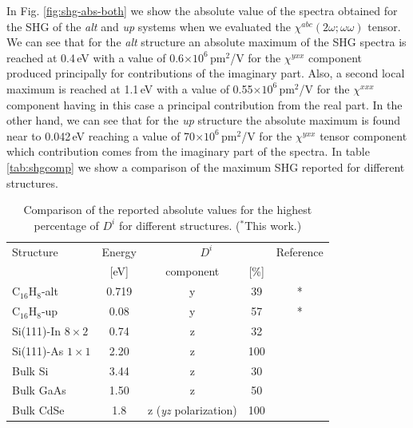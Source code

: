 \documentclass[pss]{wiley2sp} %
\begin{document}
In Fig. \ref{fig:shg-abs-both}  we show the absolute value of the  spectra obtained
for the SHG of the \emph{alt} and \emph{up} systems when we evaluated the $
\chi^{abc}(2\omega;\omega\omega) $ tensor. We can see
that for the \emph{alt} structure an absolute
maximum of the SHG spectra is reached at 0.4\,eV with a value of
0.6$\times10^{6} $\,pm$^{2}$/V for the $\chi^{yxx} $ component produced
principally for contributions of the imaginary part. Also, a second local
maximum is reached at 1.1\,eV with a value of 0.55$\times10^{6} $\,pm$^{2}$/V
for the $\chi^{xxx} $ component having in this case a principal contribution
from the real part. In the other hand, we can see that for the
\emph{up} structure the absolute maximum is found near to 0.042\,eV reaching a
value of 70$\times10^{6} $\,pm$^{2}$/V for the $\chi^{yxx} $ tensor component
which contribution comes from the imaginary part of the spectra. In table
\ref{tab:shgcomp} we show a comparison of the maximum SHG reported for
different structures.


\begin{table}
    \caption{Comparison of the reported absolute values for the highest 
    percentage of {$D^{i}$} for different structures. ($^{*}$This work.)}
    \label{tab:dacomp}
    \centering
    \begin{tabular}{lcccc}
    Structure & Energy &  \multicolumn{2}{c}{$D^{i}$} &  Reference\\
    \cline{3-4}
              & [eV]   & component & [\%] \\
    \hline
    C$_{16}$H$_{8}$-alt               & 0.719 & y & 39 & *     \\
    C$_{16}$H$_{8}$-up                & 0.08  & y & 57 & *     \\
    Si(111)-In $8\times2$   & 0.74  & z & 32 & \cite{arzate2014optical}  \\
    Si(111)-As $1\times1$   & 2.20  & z & 100& \cite{mendoza2012optical} \\
    Bulk Si                 & 3.44  & z & 30 & \cite{nastos2007full}     \\
    Bulk GaAs               & 1.50  & z & 50 & \cite{nastos2007full} 
    \cite{bhat2005excitonic} \\
    Bulk CdSe               & 1.8   & z {\scriptsize (\emph{yz} polarization)} 
    & 100& \cite{nastos2007full}\\
    \end{tabular}
\end{table}
\end{document}
